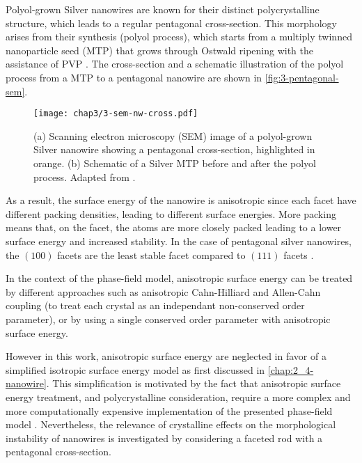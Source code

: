 Polyol-grown Silver nanowires are known for their distinct polycrystalline structure, which leads to a regular pentagonal cross-section. This morphology arises from their synthesis (polyol process), which starts from a multiply twinned nanoparticle seed (MTP) that grows through Ostwald ripening with the assistance of PVP \cite{Sun2003,LangleyGiustiMayousseCelleBelletSimonato2013}.
The cross-section and a schematic illustration of the polyol process from a MTP to a pentagonal nanowire are shown in \autoref{fig:3-pentagonal-sem}.
    \begin{figure}[H]
        \centering
        \texttt{[image: chap3/3-sem-nw-cross.pdf]}
        \caption{(a) Scanning electron microscopy (SEM) image of a polyol-grown Silver nanowire showing a pentagonal cross-section, highlighted in orange. (b) Schematic of a Silver MTP before and after the polyol process. Adapted from \cite{Sun2003}.}
        \label{fig:3-pentagonal-sem}
    \end{figure}
As a result, the surface energy of the nanowire is anisotropic since each facet have different packing densities, leading to different surface energies. More packing means that, on the facet, the atoms are more closely packed leading to a lower surface energy and increased stability. In the case of pentagonal silver nanowires, the $(100)$ facets are the least stable facet compared to  $(111)$ facets \cite{MarzbanradRiversPengZhaoZhou2015,GorshkovTereshchukSareh2020,LiangYu2019}. 

In the context of the phase-field model, anisotropic surface energy can be treated by different approaches such as anisotropic Cahn-Hilliard and Allen-Cahn coupling (to treat each crystal as an independant non-conserved order parameter), or by using a single conserved order parameter with anisotropic surface energy.

However in this work, anisotropic surface energy are neglected in favor of a simplified isotropic surface energy model as first discussed in \autoref{chap:2_4-nanowire}. This simplification is motivated by the fact that anisotropic surface energy treatment, and polycrystalline consideration, require a more complex and more computationally expensive implementation of the presented phase-field model \cite{RoyVarmaGururajan2021,RoyGururajan2021,BellonLi2021,ChockalingamKouznetsovaSluisGeers2016,XueChengLeiWen2022,TorabiWiseLowengrubRätzVoigt2007,TorabiLowengrubVoigtWise2009}. 
Nevertheless, the relevance of crystalline effects on the morphological instability of nanowires is investigated by considering a faceted rod with a pentagonal cross-section. 


